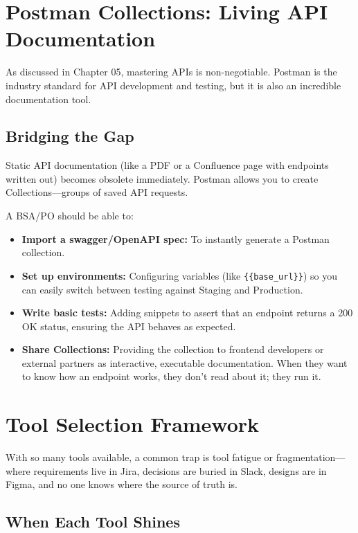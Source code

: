 \documentclass[
  11pt,
  openany,
  oneside]{book}
\providecommand{\tightlist}{%
  \setlength{\itemsep}{0pt}\setlength{\parskip}{0pt}}
\begin{document}
\section{Postman Collections: Living API
Documentation}\label{postman-collections-living-api-documentation}

As discussed in Chapter 05, mastering APIs is non-negotiable. Postman is
the industry standard for API development and testing, but it is also an
incredible documentation tool.

\subsection{Bridging the Gap}\label{bridging-the-gap}

Static API documentation (like a PDF or a Confluence page with endpoints
written out) becomes obsolete immediately. Postman allows you to create
Collections---groups of saved API requests.

A BSA/PO should be able to:

\begin{itemize}
\tightlist
\item
  \textbf{Import a swagger/OpenAPI spec:} To instantly generate a
  Postman collection.
\item
  \textbf{Set up environments:} Configuring variables (like
  \texttt{\{\{base\_url\}\}}) so you can easily switch between testing
  against Staging and Production.
\item
  \textbf{Write basic tests:} Adding snippets to assert that an endpoint
  returns a 200 OK status, ensuring the API behaves as expected.
\item
  \textbf{Share Collections:} Providing the collection to frontend
  developers or external partners as interactive, executable
  documentation. When they want to know how an endpoint works, they
  don't read about it; they run it.
\end{itemize}

\section{Tool Selection Framework}\label{tool-selection-framework}

With so many tools available, a common trap is tool fatigue or
fragmentation---where requirements live in Jira, decisions are buried in
Slack, designs are in Figma, and no one knows where the source of truth
is.

\subsection{When Each Tool Shines}\label{when-each-tool-shines}
\end{document}
